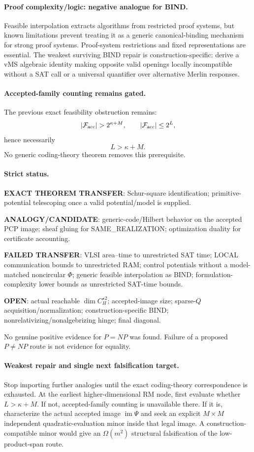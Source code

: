 \documentclass[11pt]{article}
\begin{document}
\paragraph{Proof complexity/logic: negative analogue for BIND.}
Feasible interpolation extracts algorithms from restricted proof systems, but known limitations prevent treating it as a generic canonical-binding mechanism for strong proof systems. Proof-system restrictions and fixed representations are essential. The weakest surviving BIND repair is construction-specific: derive a vMS algebraic identity making opposite valid openings locally incompatible without a SAT call or a universal quantifier over alternative Merlin responses.

\paragraph{Accepted-family counting remains gated.}
The previous exact feasibility obstruction remains:
\[
|\mathcal F_{\rm acc}|>2^{\kappa+M},
\qquad
|\mathcal F_{\rm acc}|\le 2^L,
\]
hence necessarily
\[
L>\kappa+M.
\]
No generic coding-theory theorem removes this prerequisite.

\paragraph{Strict status.}
\textbf{EXACT THEOREM TRANSFER}: Schur-square identification; primitive-potential telescoping once a valid potential/model is supplied.

\textbf{ANALOGY/CANDIDATE}: generic-code/Hilbert behavior on the accepted PCP image; sheaf gluing for SAME\_REALIZATION; optimization duality for certificate accounting.

\textbf{FAILED TRANSFER}: VLSI area--time to unrestricted SAT time; LOCAL communication bounds to unrestricted RAM; control potentials without a model-matched noncircular $\Phi$; generic feasible interpolation as BIND; formulation-complexity lower bounds as unrestricted SAT-time bounds.

\textbf{OPEN}: actual reachable $\dim C_H^{\star2}$; accepted-image size; sparse-$Q$ acquisition/normalization; construction-specific BIND; nonrelativizing/nonalgebrizing hinge; final diagonal.

No genuine positive evidence for $P=NP$ was found. Failure of a proposed $P\ne NP$ route is not evidence for equality.

\paragraph{Weakest repair and single next falsification target.}
Stop importing further analogies until the exact coding-theory correspondence is exhausted. At the earliest higher-dimensional RM node, first evaluate whether $L>\kappa+M$. If not, accepted-family counting is unavailable there. If it is, characterize the actual accepted image $\operatorname{im}\Psi$ and seek an explicit $M\times M$ independent quadratic-evaluation minor inside that legal image. A construction-compatible minor would give an $\Omega(m^2)$ structural falsification of the low-product-span route.
\end{document}
